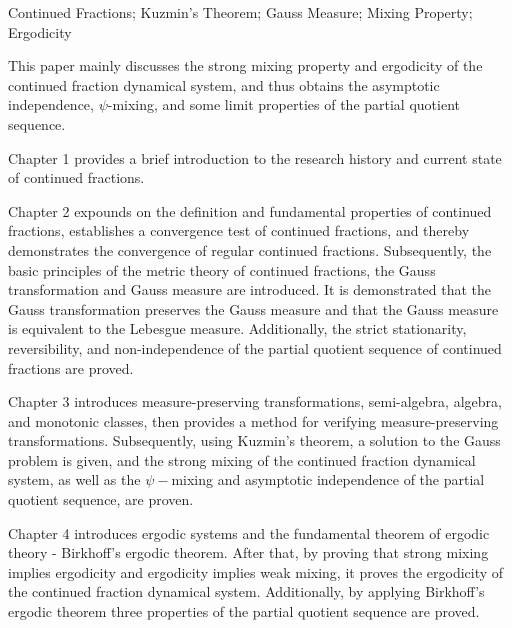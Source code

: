 \begin{enabstract}{Continued Fractions; Kuzmin's Theorem; Gauss Measure; Mixing Property; Ergodicity}

    This paper mainly discusses the strong mixing property and ergodicity of the continued fraction dynamical system, and thus obtains the asymptotic independence, $\psi$-mixing, and some limit properties of the partial quotient sequence.

    Chapter 1 provides a brief introduction to the research history and current state of continued fractions.

    Chapter 2 expounds on the definition and fundamental properties of continued fractions, establishes a convergence test of continued fractions, and thereby demonstrates the convergence of regular continued fractions. Subsequently, the basic principles of the metric theory of continued fractions, the Gauss transformation and Gauss measure are introduced. It is demonstrated that the Gauss transformation preserves the Gauss measure and that the Gauss measure is equivalent to the Lebesgue measure. Additionally, the strict stationarity, reversibility, and non-independence of the partial quotient sequence of continued fractions are proved.

    Chapter 3 introduces measure-preserving transformations, semi-algebra, algebra, and monotonic classes, then provides a method for verifying measure-preserving transformations. Subsequently, using Kuzmin's theorem, a solution to the Gauss problem is given, and the strong mixing of the continued fraction dynamical system, as well as the $\psi-$mixing and asymptotic independence of the partial quotient sequence, are proven.

    Chapter 4 introduces ergodic systems and the fundamental theorem of ergodic theory - Birkhoff's ergodic theorem. After that, by proving that strong mixing implies ergodicity and ergodicity implies weak mixing, it proves the ergodicity of the continued fraction dynamical system. Additionally, by applying Birkhoff's ergodic theorem three properties of the partial quotient sequence are proved.

\end{enabstract}
